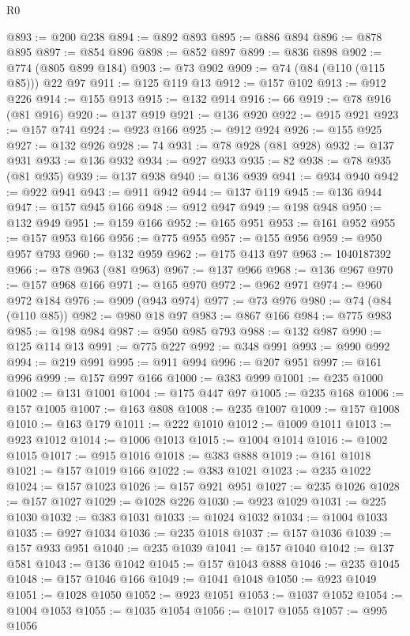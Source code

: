\begin{lexlean}{R0}
\begin{coremodule}
@893 := @200 @238
@894 := @892 @893
@895 := @886 @894
@896 := @878 @895
@897 := @854 @896
@898 := @852 @897
@899 := @836 @898
@902 := @774 (@805 @899 @184)
@903 := @73 @902
@909 := @74 (@84 (@110 (@115 @85))) @22 @97
@911 := @125 @119 @13
@912 := @157 @102
@913 := @912 @226
@914 := @155 @913
@915 := @132 @914
@916 := 66
@919 := @78 @916 (@81 @916)
@920 := @137 @919
@921 := @136 @920
@922 := @915 @921
@923 := @157 @741
@924 := @923 @166
@925 := @912 @924
@926 := @155 @925
@927 := @132 @926
@928 := 74
@931 := @78 @928 (@81 @928)
@932 := @137 @931
@933 := @136 @932
@934 := @927 @933
@935 := 82
@938 := @78 @935 (@81 @935)
@939 := @137 @938
@940 := @136 @939
@941 := @934 @940
@942 := @922 @941
@943 := @911 @942
@944 := @137 @119
@945 := @136 @944
@947 := @157 @945 @166
@948 := @912 @947
@949 := @198 @948
@950 := @132 @949
@951 := @159 @166
@952 := @165 @951
@953 := @161 @952
@955 := @157 @953 @166
@956 := @775 @955
@957 := @155 @956
@959 := @950 @957 @793
@960 := @132 @959
@962 := @175 @413 @97
@963 := 1040187392
@966 := @78 @963 (@81 @963)
@967 := @137 @966
@968 := @136 @967
@970 := @157 @968 @166
@971 := @165 @970
@972 := @962 @971
@974 := @960 @972 @184
@976 := @909 (@943 @974)
@977 := @73 @976
@980 := @74 (@84 (@110 @85))
@982 := @980 @18 @97
@983 := @867 @166
@984 := @775 @983
@985 := @198 @984
@987 := @950 @985 @793
@988 := @132 @987
@990 := @125 @114 @13
@991 := @775 @227
@992 := @348 @991
@993 := @990 @992
@994 := @219 @991
@995 := @911 @994
@996 := @207 @951
@997 := @161 @996
@999 := @157 @997 @166
@1000 := @383 @999
@1001 := @235 @1000
@1002 := @131 @1001
@1004 := @175 @447 @97
@1005 := @235 @168
@1006 := @157 @1005
@1007 := @163 @808
@1008 := @235 @1007
@1009 := @157 @1008
@1010 := @163 @179
@1011 := @222 @1010
@1012 := @1009 @1011
@1013 := @923 @1012
@1014 := @1006 @1013
@1015 := @1004 @1014
@1016 := @1002 @1015
@1017 := @915 @1016
@1018 := @383 @888
@1019 := @161 @1018
@1021 := @157 @1019 @166
@1022 := @383 @1021
@1023 := @235 @1022
@1024 := @157 @1023
@1026 := @157 @921 @951
@1027 := @235 @1026
@1028 := @157 @1027
@1029 := @1028 @226
@1030 := @923 @1029
@1031 := @225 @1030
@1032 := @383 @1031
@1033 := @1024 @1032
@1034 := @1004 @1033
@1035 := @927 @1034
@1036 := @235 @1018
@1037 := @157 @1036
@1039 := @157 @933 @951
@1040 := @235 @1039
@1041 := @157 @1040
@1042 := @137 @581
@1043 := @136 @1042
@1045 := @157 @1043 @888
@1046 := @235 @1045
@1048 := @157 @1046 @166
@1049 := @1041 @1048
@1050 := @923 @1049
@1051 := @1028 @1050
@1052 := @923 @1051
@1053 := @1037 @1052
@1054 := @1004 @1053
@1055 := @1035 @1054
@1056 := @1017 @1055
@1057 := @995 @1056

\end{coremodule}
\end{lexlean}
